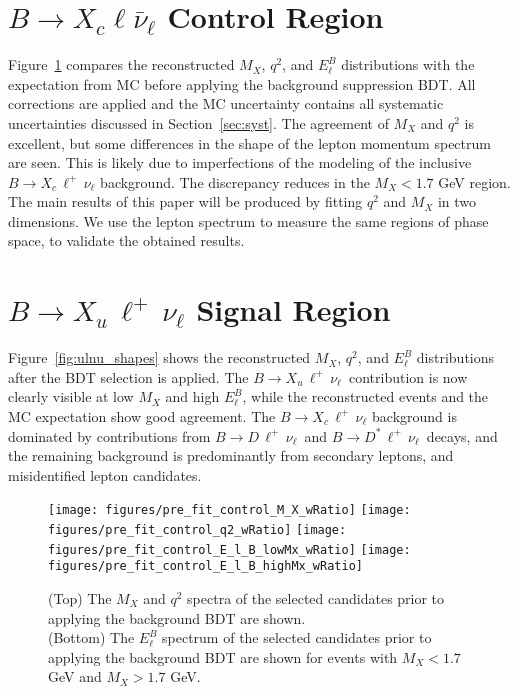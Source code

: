 \documentclass[twocolumn,aps,prd,superscriptaddress,nofootinbib,floatfix,preprintnumbers,a4]{revtex4-1}
\newcommand{\bulnu}{\ensuremath{B \to X_u \, \ell^+\, \nu_{\ell}}\xspace}
\newcommand{\bclnu}{\ensuremath{B \to X_c \, \ell^+\, \nu_{\ell}}\xspace}
\newcommand{\bdlnu}{\ensuremath{B \to D \, \ell^+\,\nu_{\ell}}\xspace}
\newcommand{\bdslnu}{\ensuremath{B \to D^* \, \ell^+\,\nu_{\ell}}\xspace}
\begin{document}
\section{$B \to X_c \ell \bar \nu_\ell$ Control Region}\label{sec:sidebands}

Figure~\ref{fig:incl_shapes} compares the reconstructed  $M_X$, $q^2$, and $E_\ell^B$ distributions with the expectation from MC before applying the background suppression BDT. All corrections are applied and the MC uncertainty contains all systematic uncertainties discussed in Section~\ref{sec:syst}. The agreement of $M_X$ and $q^2$ is excellent, but some differences in the shape of the lepton momentum spectrum are seen. This is likely due to imperfections of the modeling of the inclusive \bclnu background. The discrepancy reduces in the $M_X < 1.7$ GeV region. The main results of this paper will be produced by fitting $q^2$ and $M_X$ in two dimensions. We use the lepton spectrum to measure the same regions of phase space, to validate the obtained results.

\section{\bulnu Signal Region}\label{sec:signal}

Figure~\ref{fig:ulnu_shapes} shows the reconstructed $M_X$, $q^2$, and $E_\ell^B$ distributions after the BDT selection is applied. The \bulnu\ contribution is now clearly visible at low $M_X$ and high $E_\ell^B$, while the reconstructed events and the MC expectation show good agreement. The \bclnu background is dominated by contributions from \bdlnu\ and \bdslnu\ decays, and the remaining background is predominantly from secondary leptons, and misidentified lepton candidates. 

\clearpage

\onecolumngrid

\begin{figure}
  \texttt{[image: figures/pre\_fit\_control\_M\_X\_wRatio]} 
  \texttt{[image: figures/pre\_fit\_control\_q2\_wRatio]} 
   \texttt{[image: figures/pre\_fit\_control\_E\_l\_B\_lowMx\_wRatio]} 
   \texttt{[image: figures/pre\_fit\_control\_E\_l\_B\_highMx\_wRatio]}    
\caption{
 (Top) The $M_X$ and $q^2$ spectra of the selected candidates prior to applying the background BDT are shown. \\
 (Bottom)  The $E_\ell^B$ spectrum of the selected candidates prior to applying the background BDT are shown for events with $M_X < 1.7$ GeV and $M_X > 1.7$ GeV.
 }
\label{fig:incl_shapes}
\end{figure}
\end{document}
